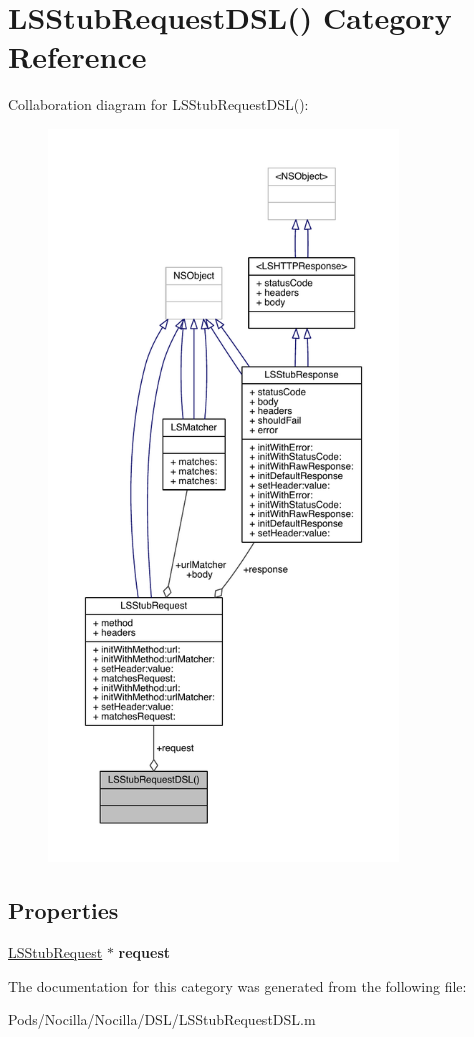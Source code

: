 \hypertarget{category_l_s_stub_request_d_s_l_07_08}{\section{L\-S\-Stub\-Request\-D\-S\-L() Category Reference}
\label{category_l_s_stub_request_d_s_l_07_08}
}


Collaboration diagram for L\-S\-Stub\-Request\-D\-S\-L()\-:\nopagebreak
\begin{figure}[H]
\begin{center}
\leavevmode
\includegraphics[height=550pt]{category_l_s_stub_request_d_s_l_07_08__coll__graph}
\end{center}
\end{figure}
\subsection*{Properties}
\begin{DoxyCompactItemize}
\item 
\hypertarget{category_l_s_stub_request_d_s_l_07_08_abebe099d30279d8f7ec1c1e1a95cf256}{\hyperlink{interface_l_s_stub_request}{L\-S\-Stub\-Request} $\ast$ {\bfseries request}}\label{category_l_s_stub_request_d_s_l_07_08_abebe099d30279d8f7ec1c1e1a95cf256}

\end{DoxyCompactItemize}


The documentation for this category was generated from the following file\-:\begin{DoxyCompactItemize}
\item 
Pods/\-Nocilla/\-Nocilla/\-D\-S\-L/L\-S\-Stub\-Request\-D\-S\-L.\-m\end{DoxyCompactItemize}
